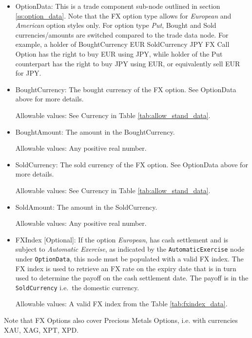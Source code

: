 \begin{itemize}
\item OptionData: This is a trade component sub-node outlined in section \ref{ss:option_data}. Note that the
FX option type allows for \emph{European} and \emph{American} option styles only. For option type \emph{Put}, Bought and Sold currencies/amounts are switched compared to the trade data node.
For example, a holder of BoughtCurrency EUR SoldCurrency JPY FX Call Option has the right to buy EUR using JPY, while
holder of the Put counterpart has the right to buy JPY using EUR, or equivalently sell EUR for JPY.

\item BoughtCurrency: The bought currency of the FX option. See OptionData above for more details.

Allowable values: See Currency in Table \ref{tab:allow_stand_data}.

\item BoughtAmount: The amount in the BoughtCurrency.

Allowable values: Any positive real number.

\item SoldCurrency: The sold currency of the FX option. See OptionData above for more details.

Allowable values: See Currency in Table \ref{tab:allow_stand_data}.

\item SoldAmount: The amount in the SoldCurrency.

Allowable values: Any positive real number.

\item FXIndex [Optional]: If the option \textit{European}, has cash settlement and is subject to \textit{Automatic Exercise}, as indicated by the \lstinline!AutomaticExercise! node under \lstinline!OptionData!, this node must be populated with a valid FX index. The FX index is used to retrieve an FX rate on the expiry date that is in turn used to determine the payoff on the cash settlement date. The payoff is in the \lstinline!SoldCurrency! i.e.\ the domestic currency.

Allowable values: A valid FX index from the Table \ref{tab:fxindex_data}.

\end{itemize}

Note that FX Options also cover Precious Metals Options, i.e. with currencies XAU, XAG, XPT, XPD.